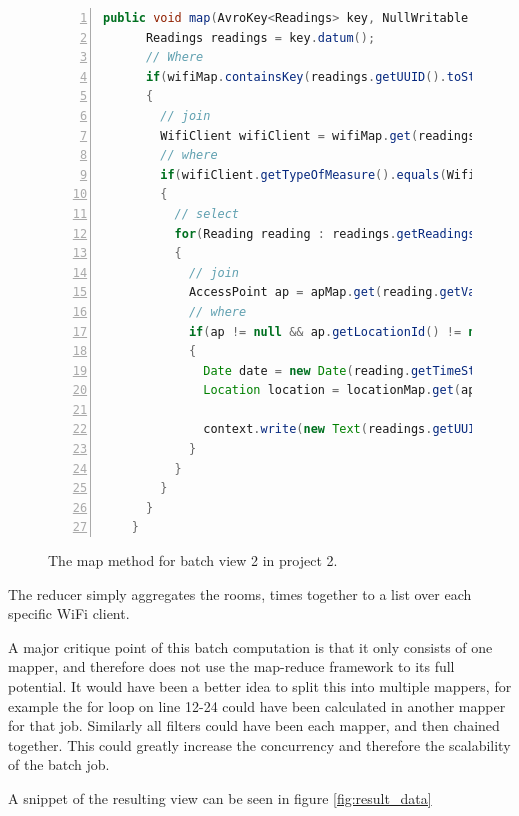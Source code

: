	\begin{figure}[H]
		
	\begin{lstlisting}[frame=single, backgroundcolor=\color{light-gray}, basicstyle=\footnotesize\ttfamily, language=Java, numbers=left, numberstyle=\tiny \color{black}, breaklines=true]
	public void map(AvroKey<Readings> key, NullWritable value, Context context) throws IOException, InterruptedException {
	  Readings readings = key.datum();
	  // Where
	  if(wifiMap.containsKey(readings.getUUID().toString()))
	  {
		// join
	    WifiClient wifiClient = wifiMap.get(readings.getUUID().toString());
	    // where
	    if(wifiClient.getTypeOfMeasure().equals(WifiClientMeasure.AccessPoint))
	    {
		  // select
	      for(Reading reading : readings.getReadings())
	      {
		    // join
	        AccessPoint ap = apMap.get(reading.getValue());
	        // where
	        if(ap != null && ap.getLocationId() != null && locationMap.containsKey(ap.getLocationId()))
	        {
	          Date date = new Date(reading.getTimeStamp());
	          Location location = locationMap.get(ap.getLocationId());
	           
	          context.write(new Text(readings.getUUID().toString()), new Text(location.getRoom() + "-" + dateFormat.format(date)));
	        }
	      }
	    }
	  }
	}
	\end{lstlisting}
	\caption{The map method for batch view 2 in project 2.}
	\label{code:project2_mapper}
	\end{figure}
	
	The reducer simply aggregates the rooms, times together to a list over each specific WiFi client.
	
	\newpar A major critique point of this batch computation is that it only consists of one mapper, and therefore does not use the map-reduce framework to its full potential. It would have been a better idea to split this into multiple mappers, for example the for loop on line 12-24 could have been calculated in another mapper for that job. Similarly all filters could have been each mapper, and then chained together. This could greatly increase the concurrency and therefore the scalability of the batch job.
	
	\newpar A snippet of the resulting view can be seen in figure \ref{fig:result_data}
	
